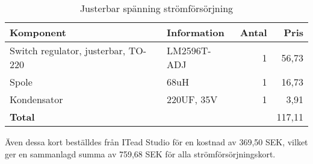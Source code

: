 \begin{table}[htbp!]
\centering
\caption{Justerbar spänning strömförsörjning}
\begin{tabular}{|l|l|r|r|}
\hline
\textbf{Komponent} & \textbf{Information} & \textbf{Antal} & \textbf{Pris} \\
\hline
Switch regulator, justerbar, TO-220  & LM2596T-ADJ  & 1 & 56,73 \\ 
\hline
Spole  & 68uH & 1 & 16,73 \\ 
\hline
Kondensator & 220UF, 35V  & 1 & 3,91 \\ 
\hline
\textbf{Total} &  & \multicolumn{1}{l|}{} & 117,11 \\ 
\hline
\end{tabular}
\label{justerbar}
\end{table}

Även dessa kort beställdes från ITead Studio för en kostnad av 369,50 SEK, vilket ger en sammanlagd summa av 759,68 SEK för alla strömförsörjningskort.



